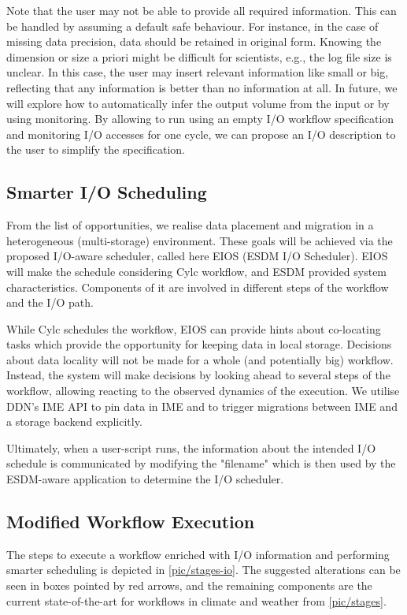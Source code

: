 \documentclass{superfri}
\begin{document}
Note that the user may not be able to provide all required information.
This can be handled by assuming a default safe behaviour.
For instance, in the case of missing data precision, data should be retained in original form.
Knowing the dimension or size a priori might be difficult for scientists, e.g., the log file size is unclear.
In this case, the user may insert relevant information like small or big, reflecting that any information is better than no information at all.
In future, we will explore how to automatically infer the output volume from the input or by using monitoring.
By allowing to run using an empty I/O workflow specification and monitoring I/O accesses for one cycle, we can propose an I/O description to the user to simplify the specification.

\subsection{Smarter I/O Scheduling}

From the list of opportunities, we realise data placement and migration in a heterogeneous (multi-storage) environment.
These goals will be achieved via the proposed I/O-aware scheduler, called here EIOS (ESDM I/O Scheduler).
EIOS will make the schedule considering Cylc workflow, and ESDM provided system characteristics.
Components of it are involved in different steps of the workflow and the I/O path.

While Cylc schedules the workflow, EIOS can provide hints about co-locating tasks which provide the opportunity for keeping data in local storage.
Decisions about data locality will not be made for a whole (and potentially big) workflow.
Instead, the system will make decisions by looking ahead to several steps of the workflow, allowing reacting to the observed dynamics of the execution.
We utilise DDN's IME API to pin data in IME and to trigger migrations between IME and a storage backend explicitly.

Ultimately, when a user-script runs, the information about the intended I/O schedule is communicated by modifying the "filename" which is then used by the ESDM-aware application to determine the I/O scheduler.

\subsection{Modified Workflow Execution}

The steps to execute a workflow enriched with I/O information and performing smarter scheduling is depicted in \cref{pic/stages-io}.
The suggested alterations can be seen in boxes pointed by red arrows, and the remaining components are the current state-of-the-art for workflows in climate and weather from \cref{pic/stages}.
\end{document}
